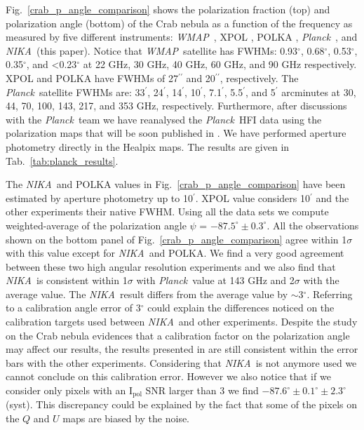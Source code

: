 \documentclass[twocolumn,traditabstract]{aa}
\def\NIKA{\textit{NIKA}}
\def\Planck{\textit{Planck}}
\def\WMAP{\textit{WMAP}}
\begin{document}
Fig.~\ref{crab_p_angle_comparison} shows the polarization fraction (top) and polarization angle (bottom) of the Crab nebula as a function of the frequency as measured by
five different instruments: 
\WMAP\ \citep{2011ApJS..192...19W}, XPOL \citep{aumont2010}, POLKA \citep{2014PASP..126.1027W}, \Planck\ \citep{2015arXiv150702058P}, and \NIKA\ (this paper). 
Notice that \WMAP\ satellite has FWHMs: 0.93$^{\circ}$, 0.68$^{\circ}$, 0.53$^{\circ}$, 0.35$^{\circ}$, and \textless 0.23$^{\circ}$ at 22 GHz, 30 GHz, 40 GHz, 60 GHz, and 90 GHz respectively. XPOL and POLKA have FWHMs of 27$^{\prime\prime}$ and 20$^{\prime\prime}$, respectively.
The \Planck\ satellite FWHMs are: 33$^{\prime}$, 24$^{\prime}$, 14$^{\prime}$, 10$^{\prime}$, 7.1$^{\prime}$, 5.5$^{\prime}$, and 5$^{\prime}$ arcminutes at 30, 44, 70, 100, 143, 217, and 353 GHz, respectively. Furthermore, after discussions with the \Planck\ team we have reanalysed the \Planck\ HFI data using the polarization maps that will be soon published in \cite{planck2018}. We have performed aperture photometry directly in the Healpix maps. The results are given in Tab.~\ref{tab:planck_results}.

The \NIKA\ and POLKA values in Fig.~\ref{crab_p_angle_comparison} have been estimated by aperture photometry up to 10$^{\prime}$. XPOL value considers 10$^{\prime}$ \citep{aumont2010} and the other experiments their native FWHM.
Using all the data sets we compute weighted-average of the polarization angle $\psi$ = $-87.5^{\circ}\pm 0.3^{\circ}$.  
All the observations shown on the bottom panel of
Fig.~\ref{crab_p_angle_comparison} agree within 1$\sigma$ with this value except for \NIKA\ and POLKA.
We find a very good agreement between these two high angular resolution experiments and we also find that \NIKA\ is consistent within 1$\sigma$ with \Planck\ value at 143 GHz and 2$\sigma$ with the average value.
The \NIKA\ result differs from the average value by $\sim$3$^{\circ}$. 
Referring to \cite{ritacco2017} a calibration angle error of 3$^{\circ}$ could explain the differences noticed on the calibration targets used between \NIKA\ and other experiments. Despite the study on the Crab nebula evidences that a calibration factor on the polarization angle may affect our results, the results presented in \cite{ritacco2017} are still consistent within the error bars with the other experiments. Considering that \NIKA\ is not anymore used we cannot conclude on this calibration error.
However we also notice that if we consider only pixels with an $\textrm{I}_\textrm{pol}$ SNR larger than 3 we find $-87.6^{\circ} \pm 0.1^{\circ} \pm 2.3^{\circ}$(syst). This discrepancy could be explained by the fact that some of the pixels on the $Q$ and $U$ maps are biased by the noise.
  
\end{document}
